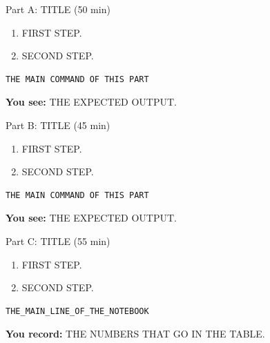 \begin{frame}[fragile]{Part A: TITLE (50 min)}
  \begin{enumerate}
    \item FIRST STEP.
    \item SECOND STEP.
  \end{enumerate}
  \begin{lstlisting}[style=shell]
THE MAIN COMMAND OF THIS PART
  \end{lstlisting}
  \textbf{You see:} THE EXPECTED OUTPUT.
\end{frame}

\begin{frame}[fragile]{Part B: TITLE (45 min)}
  \begin{enumerate}
    \item FIRST STEP.
    \item SECOND STEP.
  \end{enumerate}
  \begin{lstlisting}[style=shell]
THE MAIN COMMAND OF THIS PART
  \end{lstlisting}
  \textbf{You see:} THE EXPECTED OUTPUT.
\end{frame}

\begin{frame}[fragile]{Part C: TITLE (55 min)}
  \begin{enumerate}
    \item FIRST STEP.
    \item SECOND STEP.
  \end{enumerate}
  \begin{lstlisting}[style=python]
THE_MAIN_LINE_OF_THE_NOTEBOOK
  \end{lstlisting}
  \textbf{You record:} THE NUMBERS THAT GO IN THE TABLE.
\end{frame}
